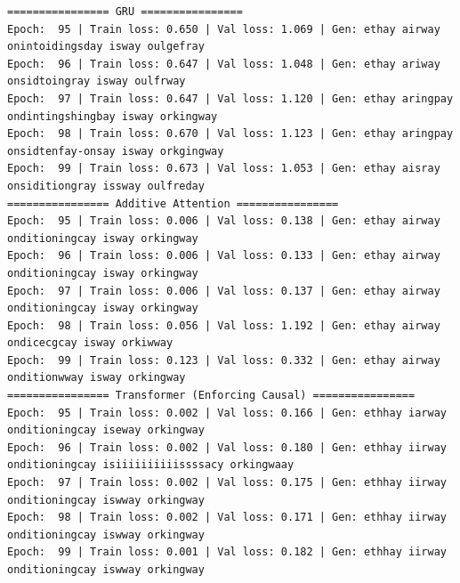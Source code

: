 \documentclass{article}
\begin{document}
\begin{lstlisting}
================ GRU ================
Epoch:  95 | Train loss: 0.650 | Val loss: 1.069 | Gen: ethay airway onintoidingsday isway oulgefray
Epoch:  96 | Train loss: 0.647 | Val loss: 1.048 | Gen: ethay ariway onsidtoingray isway oulfrway
Epoch:  97 | Train loss: 0.647 | Val loss: 1.120 | Gen: ethay aringpay ondintingshingbay isway orkingway
Epoch:  98 | Train loss: 0.670 | Val loss: 1.123 | Gen: ethay aringpay onsidtenfay-onsay isway orkgingway
Epoch:  99 | Train loss: 0.673 | Val loss: 1.053 | Gen: ethay aisray onsiditiongray issway oulfreday
================ Additive Attention ================
Epoch:  95 | Train loss: 0.006 | Val loss: 0.138 | Gen: ethay airway onditioningcay isway orkingway
Epoch:  96 | Train loss: 0.006 | Val loss: 0.133 | Gen: ethay airway onditioningcay isway orkingway
Epoch:  97 | Train loss: 0.006 | Val loss: 0.137 | Gen: ethay airway onditioningcay isway orkingway
Epoch:  98 | Train loss: 0.056 | Val loss: 1.192 | Gen: ethay airway ondicecgcay isway orkiwway
Epoch:  99 | Train loss: 0.123 | Val loss: 0.332 | Gen: ethay airway onditionwway isway orkingway
================ Transformer (Enforcing Causal) ================
Epoch:  95 | Train loss: 0.002 | Val loss: 0.166 | Gen: ethhay iarway onditioningcay iseway orkingway
Epoch:  96 | Train loss: 0.002 | Val loss: 0.180 | Gen: ethhay iirway onditioningcay isiiiiiiiiiissssacy orkingwaay
Epoch:  97 | Train loss: 0.002 | Val loss: 0.175 | Gen: ethhay iirway onditioningcay iswway orkingway
Epoch:  98 | Train loss: 0.002 | Val loss: 0.171 | Gen: ethhay iirway onditioningcay iswway orkingway
Epoch:  99 | Train loss: 0.001 | Val loss: 0.182 | Gen: ethhay iirway onditioningcay iswway orkingway
\end{lstlisting}
\end{document}
